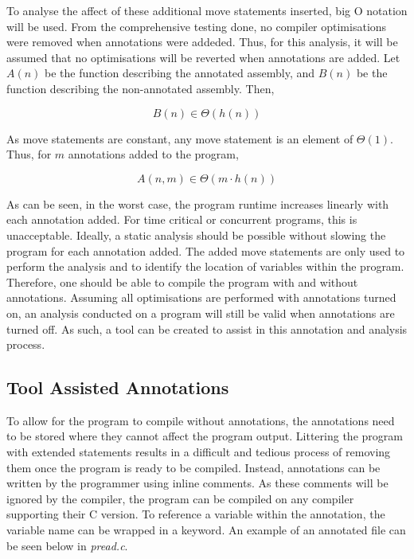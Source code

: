 To analyse the affect of these additional move statements inserted, big O notation will be used. From the comprehensive testing done, no compiler optimisations were removed when annotations were addeded. Thus, for this analysis, it will be assumed that no optimisations will be reverted when annotations are added. Let \(A(n)\) be the function describing the annotated assembly, and \(B(n)\) be the function describing the non-annotated assembly. Then,

\[B(n) \in \Theta(h(n))\]

As move statements are constant, any move statement is an element of \(\Theta(1)\). Thus, for \(m\) annotations added to the program, 

\[A(n, m) \in \Theta(m \cdot h(n))\]

As can be seen, in the worst case, the program runtime increases linearly with each annotation added. For time critical or concurrent programs, this is unacceptable. Ideally, a static analysis should be possible without slowing the program for each annotation added. The added move statements are only used to perform the analysis and to identify the location of variables within the program. Therefore, one should be able to compile the program with and without annotations. Assuming all optimisations are performed with annotations turned on, an analysis conducted on a program will still be valid when annotations are turned off. As such, a tool can be created to assist in this annotation and analysis process.

\subsection{Tool Assisted Annotations}
\label{subsec:inlineTool}

To allow for the program to compile without annotations, the annotations need to be stored where they cannot affect the program output. Littering the program with extended  statements results in a difficult and tedious process of removing them once the program is ready to be compiled. Instead, annotations can be written by the programmer using inline comments. As these comments will be ignored by the compiler, the program can be compiled on any compiler supporting their C version. To reference a variable within the annotation, the variable name can be wrapped in a  keyword. An example of an annotated file can be seen below in \textit{pread.c}.



